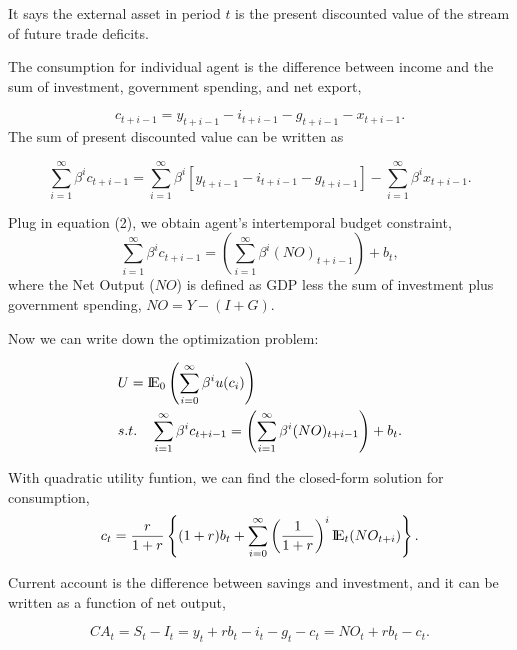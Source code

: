 \documentclass[12pt]{article}
\begin{document}
It says the external asset in period $ t $ is the present discounted value of the 
stream of future trade deficits.


The consumption for individual agent is the difference between income and the sum
of investment, government spending, and net export,

\begin{equation}
c_{t + i - 1} = y_{t + i - 1} - i_{t + i - 1} - g_{t + i - 1} - x_{t + i - 1}.
\end{equation}
The sum of present discounted value can be written as

\begin{equation}
\sum\limits_{i = 1} ^\infty \beta^{i} c_{t + i - 1} = \sum\limits_{i = 1} ^\infty 
\beta^{i} [y_{t + i - 1} - i_{t + i - 1} - g_{t + i - 1}] - 
\sum\limits_{i = 1} ^\infty \beta^{i}x_{t + i - 1}.
\end{equation}

Plug in equation (2), we obtain agent's intertemporal budget constraint,
\begin{equation}
\sum\limits_{i = 1} ^\infty \beta^{i} c_{t + i - 1} =\left( 
\sum\limits_{i = 1} ^\infty 
\beta^{i} (NO)_{t + i - 1}\right) 
 + b_{t},
\end{equation}
where the Net Output ($ NO $) is defined as GDP less the sum of investment plus 
government spending, $ NO = Y - (I + G) $.

Now we can write down the optimization problem:

\begin{align*}
&U = {\rm I\!{E}}_{0}\left( \sum\limits_{i = 0} ^\infty \beta^{i} u(c_{i})	 \right)\\
& s.t. \quad
\sum\limits_{i = 1} ^\infty \beta^{i} c_{t + i - 1} =\left( 
\sum\limits_{i = 1} ^\infty 
\beta^{i} (NO)_{t + i - 1}\right) 
 + b_{t}.
\end{align*}


With quadratic utility funtion, we can find the closed-form solution for consumption,
\begin{equation}
c_{t} = \frac{r}{1 + r}\left\{ 
(1 + r)b_{t} + \sum\limits_{i = 0} ^\infty \left( \frac{1}{1 + r} \right)^{i}
{\rm I\!{E}}_{t}(NO_{t + i})
\right\}.
\end{equation}



Current account is the difference between savings and investment, and it can be
written as a function of net output,

\begin{equation}
CA_{t} = S_{t} - I_{t} = y_{t} + r b_{t}  - i_{t} - g_{t} - c_{t} = NO_{t} + r b_{t} - 
c_{t}.
\end{equation}
\end{document}
